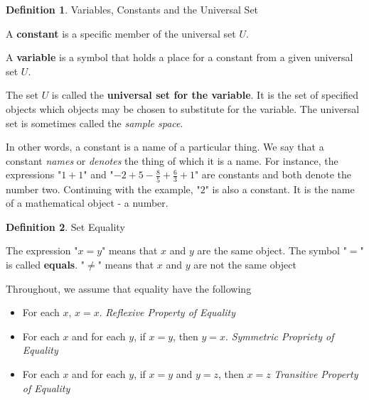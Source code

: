 \documentclass{book}
\theoremstyle{definition}
\newtheorem{definition}{Definition}[section]
\theoremstyle{remark}
\begin{document}
\begin{definition}
Variables, Constants and the Universal Set \\

    \begin{tcolorbox}
        A {\bf constant} is a specific member of the universal set $U$.
    \end{tcolorbox}
    
    \begin{tcolorbox}
        A {\bf variable} is a symbol that holds a place for a constant from a given universal set $U$.
    \end{tcolorbox}

    \begin{tcolorbox}
        The set $U$ is called the {\bf universal set for the variable}. It is the set of specified objects which objects may be chosen to substitute for the variable. The universal set is sometimes called the {\it sample space}.
    \end{tcolorbox}
    
    In other words, a constant is a name of a particular thing. We say that a constant \textit{names} or \textit{denotes} the thing of which it is a name. For instance, the expressions "$1 + 1$" and "$-2 + 5 - \frac{8}{5} + \frac{6}{3} + 1$" are constants and both denote the number two. Continuing with the example, "$2$" is also a constant. It is the name of a mathematical object - a number.
\end{definition}



\begin{definition}
Set Equality \\

    \begin{tcolorbox}
        The expression "$x=y$" means that $x$ and $y$ are the same object. The symbol "$=$" is called \textbf{equals}. "$\neq$" means that $x$ and $y$ are not the same object
    \end{tcolorbox}
    
    Throughout, we assume that equality have the following
        \begin{itemize}
            \item For each $x$, $x=x$. \textit{Reflexive Property of Equality}
            \item For each $x$ and for each $y$, if $x=y$, then $y=x$. \textit{Symmetric Propriety of Equality}
            \item For each $x$ and for each $y$, if $x=y$ and $y=z$, then $x=z$ \textit{Transitive Property of Equality}
        \end{itemize}
\end{definition}
\end{document}
